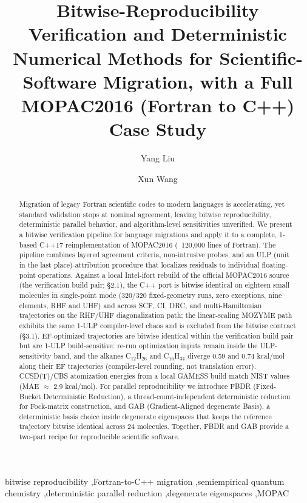 \documentclass[preprint,12pt]{elsarticle}
\begin{document}
\begin{frontmatter}

\title{Bitwise-Reproducibility Verification and Deterministic Numerical Methods for Scientific-Software Migration, with a Full MOPAC2016 (Fortran to C++) Case Study}

\author[aff1]{Yang Liu}
\author[aff1]{Xun Wang}

\begin{abstract}
Migration of legacy Fortran scientific codes to modern languages is accelerating, yet standard validation stops at nominal agreement, leaving bitwise reproducibility, deterministic parallel behavior, and algorithm-level sensitivities unverified. We present a bitwise verification pipeline for language migrations and apply it to a complete, 1-based C++17 reimplementation of MOPAC2016 (~120,000 lines of Fortran). The pipeline combines layered agreement criteria, non-intrusive probes, and an ULP (unit in the last place)-attribution procedure that localizes residuals to individual floating-point operations. Against a local Intel-ifort rebuild of the official MOPAC2016 source (the verification build pair; \S{}2.1), the C++ port is bitwise identical on eighteen small molecules in single-point mode (320/320 fixed-geometry runs, zero exceptions, nine elements, RHF and UHF) and across SCF, CI, DRC, and multi-Hamiltonian trajectories on the RHF/UHF diagonalization path; the linear-scaling MOZYME path exhibits the same 1-ULP compiler-level chaos and is excluded from the bitwise contract (\S{}3.1). EF-optimized trajectories are bitwise identical within the verification build pair but are 1-ULP build-sensitive: re-run optimization inputs remain inside the ULP-sensitivity band, and the alkanes C$_{12}$H$_{26}$ and C$_{16}$H$_{34}$ diverge 0.59 and 0.74 kcal/mol along their EF trajectories (compiler-level rounding, not translation error). CCSD(T)/CBS atomization energies from a local GAMESS build match NIST values (MAE $\approx$ 2.9 kcal/mol). For parallel reproducibility we introduce FBDR (Fixed-Bucket Deterministic Reduction), a thread-count-independent deterministic reduction for Fock-matrix construction, and GAB (Gradient-Aligned degenerate Basis), a deterministic basis choice inside degenerate eigenspaces that keeps the reference trajectory bitwise identical across 24 molecules. Together, FBDR and GAB provide a two-part recipe for reproducible scientific software.
\end{abstract}

\begin{keyword}
bitwise reproducibility \sep Fortran-to-C++ migration \sep semiempirical quantum chemistry \sep deterministic parallel reduction \sep degenerate eigenspaces \sep MOPAC
\end{keyword}

\end{frontmatter}
\end{document}
